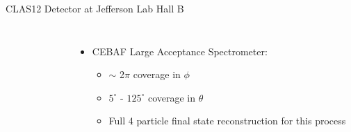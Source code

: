 \documentclass[aspectratio=169]{beamer}
\newcommand*{\myfont}{\fontfamily{lmtt}\selectfont}
\begin{document}
\begin{frame}{CLAS12 Detector at Jefferson Lab Hall B}
\begin{columns}[t, onlytextwidth]
\begin{figure}[t!]
                    
                \end{figure}
                \vspace{-0.45cm}
                \begin{itemize}
                    \setlength\itemsep{1em}

                    \item CEBAF Large Acceptance Spectrometer:\\
                     \begin{itemize}
                            \item $\sim$ 2$\pi$ coverage in $\phi$\\
                        \item  $5^\circ$ - $125^\circ$ coverage in $\theta$
                        \item Full 4 particle final state reconstruction for this process
                    \end{itemize}
                    
                    
                \end{itemize}
                {\myfont{\tiny [V. Burkert et al., NIMA, 959, 163419 (2020)] }}
        \end{columns}
\end{frame}    
\end{document}
